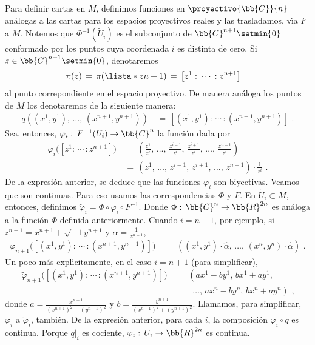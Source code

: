 \begin{ejemplo}
	Para definir cartas en $M$, definimos funciones en
	$\proyectivo{\bb{C}}{n}$ an\'{a}logas a las cartas para los espacios
	proyectivos reales y las trasladamos, v\'{\i}a $F$ a $M$.
	Notemos que $\Phi^{-1}(\widetilde{U}_{i})$ es el subconjunto de
	$\bb{C}^{n+1}\setmin\{0\}$ conformado por los puntos cuya coordenada
	$i$ es distinta de cero. Si $z\in\bb{C}^{n+1}\setmin\{0\}$,
	denotaremos
	\begin{align*}
		\pi(z) & \,=\,\pi(\lista*{z}{n+1}) \,=\,
			\left[z^{1}:\,\cdots\,:z^{n+1}\right]
	\end{align*}
	al punto correpondiente en el espacio proyectivo. De manera
	an\'{a}loga los puntos de $M$ los denotaremos de la siguiente manera:
	\begin{align*}
		q((x^{1},y^{1}),\,\dots,\,(x^{n+1},y^{n+1})) & \,=\,
			\left[(x^{1},y^{1}):\,\cdots\,:(x^{n+1},y^{n+1})\right]
		\text{ .}
	\end{align*}
	Sea, entonces, $\varphi_{i}:\,F^{-1}(U_{i})\rightarrow\bb{C}^{n}$
	la funci\'{o}n dada por
	\begin{align*}
		\varphi_{i}\big(\left[z^{1}:\,\cdots\,:z^{n+1}\right]\big) &
			\,=\,\left(\frac{z^{1}}{z^{i}},\,\dots,\,
			\frac{z^{i-1}}{z^{i}},\,\frac{z^{i+1}}{z^{i}},
			\,\dots,\,\frac{z^{n+1}}{z^{i}}\right) \\
		& \,=\,(z^{1},\,\dots,\,z^{i-1},\,z^{i+1},\,\dots,\,z^{n+1})
			\cdot\frac{1}{z^{i}}
		\text{ .}
	\end{align*}
	De la expresi\'{o}n anterior, se deduce que las funciones
	$\varphi_{i}$ son biyectivas. Veamos que son continuas. Para eso
	usamos las correspondencias $\Phi$ y $F$. En
	$\widetilde{U}_{i}\subset M$, entonces, definimos
	$\tilde{\varphi}_{i}=\Phi\circ\varphi_{i}\circ F^{-1}$. Donde
	$\Phi:\,\bb{C}^{n}\rightarrow\bb{R}^{2n}$ es an\'{a}loga a la
	funci\'{o}n $\Phi$ definida anteriormente. Cuando
	$i=n+1$, por ejemplo, si $z^{n+1}=x^{n+1}+\sqrt{-1}y^{n+1}$ y
	$\alpha=\frac{1}{z^{n+1}}$,
	\begin{align*}
		\tilde{\varphi}_{n+1}\big(\left[(x^{1},y^{1}):\,\cdots\,:
					(x^{n+1},y^{n+1})\right]\big) & \,=\,
			((x^{1},y^{1})\cdot\widehat{\alpha},\,\dots,\,
			(x^{n},y^{n})\cdot\widehat{\alpha})
		\text{ .}
	\end{align*}
	Un poco m\'{a}s expl\'{\i}citamente, en el caso $i=n+1$ (para
	simplificar),
	\begin{align*}
		\tilde{\varphi}_{n+1}\big(\left[(x^{1},y^{1}):\,\cdots\,:
					(x^{n+1},y^{n+1})\right]\big) & \,=\,
		\left(ax^{1}-by^{1},\,bx^{1}+ay^{1},\right. \\
		& \left.\qquad\,\dots,\,ax^{n}-by^{n},\,bx^{n}+ay^{n}\right)
		\text{ ,}
	\end{align*}
	donde $a=\frac{x^{n+1}}{(x^{n+1})^{2}+(y^{n+1})^{2}}$ y
	$b=\frac{y^{n+1}}{(x^{n+1})^{2}+(y^{n+1})^{2}}$.
	Llamamos, para simplificar, $\varphi_{i}$ a $\tilde{\varphi}_{i}$,
	tambi\'{e}n. De la expresi\'{o}n anterior, para cada $i$, la
	composici\'{o}n $\varphi_{i}\circ q$ es continua. Porque $q|_{i}$
	es cociente, $\varphi_{i}:\,U_{i}\rightarrow\bb{R}^{2n}$ es
	continua. 


\end{ejemplo}
